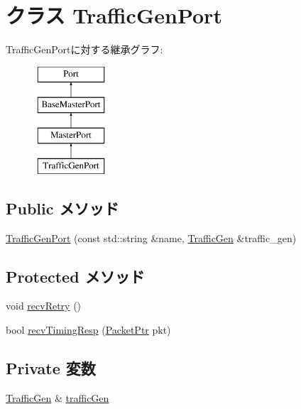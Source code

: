 \hypertarget{classTrafficGen_1_1TrafficGenPort}{
\section{クラス TrafficGenPort}
\label{classTrafficGen_1_1TrafficGenPort}
}
TrafficGenPortに対する継承グラフ:\begin{figure}[H]
\begin{center}
\leavevmode
\includegraphics[height=4cm]{classTrafficGen_1_1TrafficGenPort}
\end{center}
\end{figure}
\subsection*{Public メソッド}
\begin{DoxyCompactItemize}
\item 
\hyperlink{classTrafficGen_1_1TrafficGenPort_ab821bf413d7688aa99f497180808208c}{TrafficGenPort} (const std::string \&name, \hyperlink{classTrafficGen_1_1TrafficGen}{TrafficGen} \&traffic\_\-gen)
\end{DoxyCompactItemize}
\subsection*{Protected メソッド}
\begin{DoxyCompactItemize}
\item 
void \hyperlink{classTrafficGen_1_1TrafficGenPort_a29cb5a4f98063ce6e9210eacbdb35298}{recvRetry} ()
\item 
bool \hyperlink{classTrafficGen_1_1TrafficGenPort_a482dba5588f4bee43e498875a61e5e0b}{recvTimingResp} (\hyperlink{classPacket}{PacketPtr} pkt)
\end{DoxyCompactItemize}
\subsection*{Private 変数}
\begin{DoxyCompactItemize}
\item 
\hyperlink{classTrafficGen_1_1TrafficGen}{TrafficGen} \& \hyperlink{classTrafficGen_1_1TrafficGenPort_a72cdb30049923a138c71a3b20b6016ba}{trafficGen}
\end{DoxyCompactItemize}


